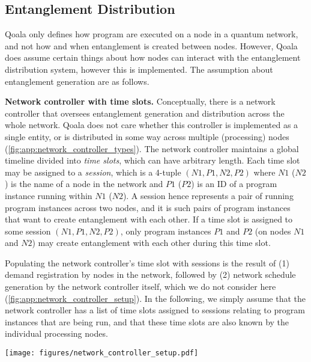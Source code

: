 \subsection{Entanglement Distribution}
\label{app:entanglement_distribution}
Qoala only defines how program are executed on a node in a quantum network,
and not how and when entanglement is created between nodes.
However, Qoala does assume certain things about how nodes can interact with the entanglement distribution system, however this is implemented.
The assumption about entanglement generation are as follows.

\textbf{Network controller with time slots.}
Conceptually, there is a network controller that oversees entanglement generation and distribution across the whole network.
Qoala does not care whether this controller is implemented as a single entity, or is distributed in some way across multiple (processing) nodes (\cref{fig:app:network_controller_types}).
The network controller maintains a global timeline divided into \textit{time slots}, which can have arbitrary length.
Each time slot may be assigned to a \textit{session}, which is a 4-tuple $(N1, P1, N2, P2)$ where $N1$ ($N2$) is the name of a node in the network and $P1$ ($P2$) is an ID of a program instance running within $N1$ ($N2$).
A session hence represents a pair of running program instances across two nodes, and it is such pairs of program instances that want to create entanglement with each other. 
If a time slot is assigned to some session $(N1, P1, N2, P2)$, only program instances $P1$ and $P2$ (on nodes $N1$ and $N2$) may create entanglement with each other during this time slot.

Populating the network controller's time slot with sessions is the result of (1) demand registration by nodes in the network, followed by (2) network schedule generation by the network controller itself, which we do not consider here (\cref{fig:app:network_controller_setup}).
In the following, we simply assume that the network controller has a list of time slots assigned to sessions relating to program instances that are being run, and that these time slots are also known by the individual processing nodes.

\begin{figure*}[ht]
    \centering
    \texttt{[image: figures/network\_controller\_setup.pdf]}
    \caption{High-level steps of using the network controller.
    1. Nodes discuss among each other constraints about application execution (Capability Negotiation).
    2. The outcome of Capability Negotiation, which contains demands about entanglement generation, is sent to the network controller (Demand Registration).
    3. Based on the demands from the nodes, the network controller constructs a network schedule consisting of time slots. Each time slot is assigned to zero or more \textit{sessions}, which correspond to program instance pairs.
    }
    \label{fig:app:network_controller_setup}
\end{figure*}

